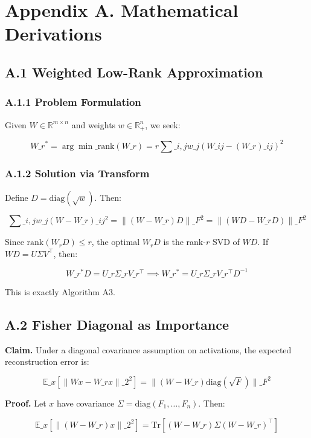 
\section{Appendix A. Mathematical Derivations}

\subsection{A.1 Weighted Low-Rank Approximation}

\subsubsection{A.1.1 Problem Formulation}

Given $W \in \mathbb{R}^{m \times n}$ and weights $w \in \mathbb{R}_+^n$, 
we seek:

\[
W\_r^* = \arg\min\_{\text{rank}(W\_r) = r} \sum\_{i, j} w\_j (W\_{ij} - (W\_r)\_{ij})^2
\tag{A.1}
\]

\subsubsection{A.1.2 Solution via Transform}

Define $D = \mathrm{diag}(\sqrt{w})$. Then:

\[
\sum\_{i, j} w\_j (W - W\_r)\_{ij}^2 = \|(W - W\_r) D\|\_F^2 = \|(W D - W\_r D)\|\_F^2
\tag{A.2}
\]

Since $\text{rank}(W_r D) \leq r$, the optimal $W_r D$ is the rank-$r$ SVD 
of $W D$. If $W D = U \Sigma V^\top$, then:

\[
W\_r^* D = U\_r \Sigma\_r V\_r^\top \implies W\_r^* = U\_r \Sigma\_r V\_r^\top D^{-1}
\tag{A.3}
\]

This is exactly Algorithm A3.

\subsection{A.2 Fisher Diagonal as Importance}

\textbf{Claim.} Under a diagonal covariance assumption on activations, the 
expected reconstruction error is:

\[
\mathbb{E}\_x\!\left[\|W x - W\_r x\|\_2^2\right] = \|(W - W\_r) \mathrm{diag}(\sqrt{F})\|\_F^2
\tag{A.4}
\]

\textbf{Proof.} Let $x$ have covariance $\Sigma = \mathrm{diag}(F_1, \dots, F_n)$. Then:

\[
\mathbb{E}\_x[\|(W - W\_r) x\|\_2^2] = \mathrm{Tr}[(W - W\_r) \Sigma (W - W\_r)^\top]
\tag{A.5}
\]

